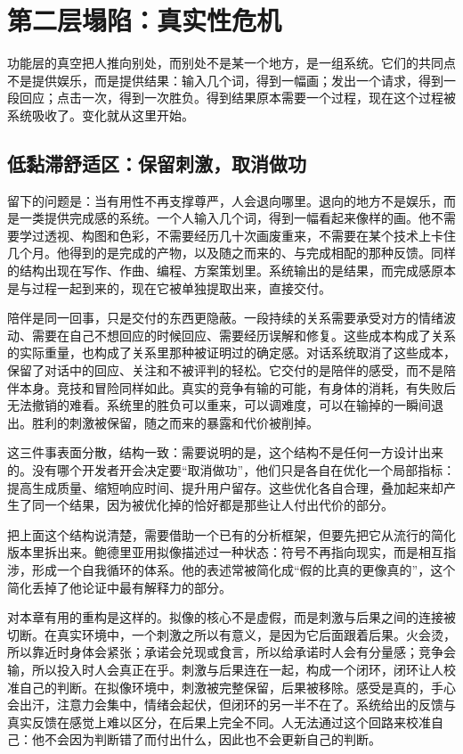 \section{第二层塌陷：真实性危机}

功能层的真空把人推向别处，而别处不是某一个地方，是一组系统。它们的共同点不是提供娱乐，而是提供结果：输入几个词，得到一幅画；发出一个请求，得到一段回应；点击一次，得到一次胜负。得到结果原本需要一个过程，现在这个过程被系统吸收了。变化就从这里开始。

\subsection{低黏滞舒适区：保留刺激，取消做功}


留下的问题是：当有用性不再支撑尊严，人会退向哪里。退向的地方不是娱乐，而是一类提供完成感的系统。一个人输入几个词，得到一幅看起来像样的画。他不需要学过透视、构图和色彩，不需要经历几十次画废重来，不需要在某个技术上卡住几个月。他得到的是完成的产物，以及随之而来的、与完成相配的那种反馈。同样的结构出现在写作、作曲、编程、方案策划里。系统输出的是结果，而完成感原本是与过程一起到来的，现在它被单独提取出来，直接交付。

陪伴是同一回事，只是交付的东西更隐蔽。一段持续的关系需要承受对方的情绪波动、需要在自己不想回应的时候回应、需要经历误解和修复。这些成本构成了关系的实际重量，也构成了关系里那种被证明过的确定感。对话系统取消了这些成本，保留了对话中的回应、关注和不被评判的轻松。它交付的是陪伴的感受，而不是陪伴本身。竞技和冒险同样如此。真实的竞争有输的可能，有身体的消耗，有失败后无法撤销的难看。系统里的胜负可以重来，可以调难度，可以在输掉的一瞬间退出。胜利的刺激被保留，随之而来的暴露和代价被削掉。

这三件事表面分散，结构一致：需要说明的是，这个结构不是任何一方设计出来的。没有哪个开发者开会决定要“取消做功”，他们只是各自在优化一个局部指标：提高生成质量、缩短响应时间、提升用户留存。这些优化各自合理，叠加起来却产生了同一个结果，因为被优化掉的恰好都是那些让人付出代价的部分。


把上面这个结构说清楚，需要借助一个已有的分析框架，但要先把它从流行的简化版本里拆出来。鲍德里亚用拟像描述过一种状态：符号不再指向现实，而是相互指涉，形成一个自我循环的体系。他的表述常被简化成“假的比真的更像真的”，这个简化丢掉了他论证中最有解释力的部分。\cite{baudrillard1981simulacres}

对本章有用的重构是这样的。拟像的核心不是虚假，而是刺激与后果之间的连接被切断。在真实环境中，一个刺激之所以有意义，是因为它后面跟着后果。火会烫，所以靠近时身体会紧张；承诺会兑现或食言，所以给承诺时人会有分量感；竞争会输，所以投入时人会真正在乎。刺激与后果连在一起，构成一个闭环，闭环让人校准自己的判断。在拟像环境中，刺激被完整保留，后果被移除。感受是真的，手心会出汗，注意力会集中，情绪会起伏，但闭环的另一半不在了。系统给出的反馈与真实反馈在感觉上难以区分，在后果上完全不同。人无法通过这个回路来校准自己：他不会因为判断错了而付出什么，因此也不会更新自己的判断。

